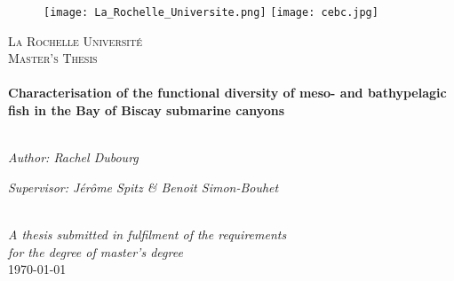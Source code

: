 \begin{titlepage}

\begin{figure}[ht]
			\texttt{[image: La\_Rochelle\_Universite.png]}
			\label{logoLR}
	   \endminipage
			\texttt{[image: cebc.jpg]}
			\label{logocebc}
		\endminipage
	\end{figure}


\begin{center}

\textsc{\LARGE La Rochelle Université}\\[1.5cm] %
\textsc{\Large Master's Thesis}\\[0.5cm] %

\HRule \\[0.4cm] %
{\huge \bfseries Characterisation of the functional diversity of meso- and bathypelagic fish in the Bay of Biscay submarine canyons }\\[0.4cm] %
\HRule \\[1.5cm] %

\begin{minipage}{0.4\textwidth}
\begin{flushleft} \large
\emph{Author: Rachel Dubourg}\\
\end{flushleft}
\end{minipage}
\begin{minipage}{0.4\textwidth}
\begin{flushright} \large
\emph{Supervisor: Jérôme Spitz \& Benoit Simon-Bouhet} \\
\end{flushright}
\end{minipage}\\[3cm]

\large \textit{A thesis submitted in fulfilment of the requirements\\ for the degree of master's degree}\\[0.3cm] %

{\large \today}\\[4cm]

            
\end{center}
\end{titlepage}